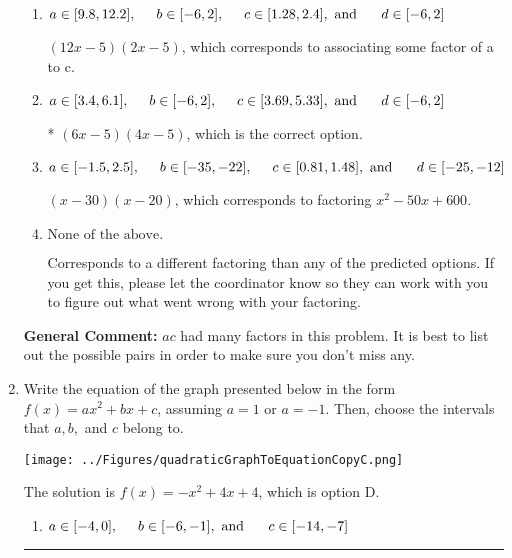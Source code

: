 \documentclass{extbook}[14pt]
\newcommand{\litem}[1]{\item #1

\rule{\textwidth}{0.4pt}}
\begin{document}
\begin{enumerate}
{\begin{enumerate}[label=\Alph*.]
 $(3x -5)(8x -5)$, which corresponds to associating some factor of c to a.
\item \( a \in [9.8, 12.2], \hspace*{5mm} b \in [-6, 2], \hspace*{5mm} c \in [1.28, 2.4], \text{ and } \hspace*{5mm} d \in [-6, 2] \)

 $(12x -5)(2x -5)$, which corresponds to associating some factor of a to c.
\item \( a \in [3.4, 6.1], \hspace*{5mm} b \in [-6, 2], \hspace*{5mm} c \in [3.69, 5.33], \text{ and } \hspace*{5mm} d \in [-6, 2] \)

* $(6x -5)(4x -5)$, which is the correct option.
\item \( a \in [-1.5, 2.5], \hspace*{5mm} b \in [-35, -22], \hspace*{5mm} c \in [0.81, 1.48], \text{ and } \hspace*{5mm} d \in [-25, -12] \)

 $(x -30)(x -20)$, which corresponds to factoring $x^{2} -50 x + 600$.
\item \( \text{None of the above.} \)

 Corresponds to a different factoring than any of the predicted options. If you get this, please let the coordinator know so they can work with you to figure out what went wrong with your factoring.
\end{enumerate}

\textbf{General Comment:} $ac$ had many factors in this problem. It is best to list out the possible pairs in order to make sure you don't miss any.
}
\litem{
Write the equation of the graph presented below in the form $f(x)=ax^2+bx+c$, assuming  $a=1$ or $a=-1$. Then, choose the intervals that $a, b,$ and $c$ belong to.

\begin{center}
    \texttt{[image: ../Figures/quadraticGraphToEquationCopyC.png]}
\end{center}


The solution is \( f(x) = -x^{2} +4 x + 4 \), which is option D.\begin{enumerate}[label=\Alph*.]
\item \( a \in [-4, 0], \hspace*{5mm} b \in [-6, -1], \text{ and } \hspace*{5mm} c \in [-14, -7] \)


\end{enumerate}}
\end{enumerate}
\end{document}

